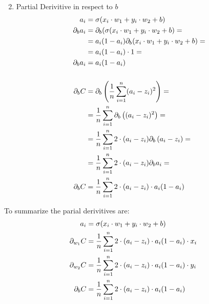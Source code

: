 \documentclass{article}
\begin{document}
\begin{enumerate}
{\begin{align}
        \end{align}
    }
    \item{
        Partial Derivitive in respect to $b$
        \begin{align}
            a_i  &= \sigma(x_i \cdot w_1 + y_i \cdot w_2 + b)  \\ 
            \pd[b]a_i &= \pd[b](\sigma(x_i \cdot w_1 + y_i \cdot w_2 + b) = \\ 
                      &= a_i(1 - a_i)\pd[b](x_i \cdot w_1 + y_i \cdot w_2 +b) = \\ 
                      &= a_i(1 - a_i) \cdot 1 = \\ 
            \pd[b]a_i &= a_i(1 - a_i) \\ 
            \\
            \pd[b]C &=\pd[b]\left(\avgsum[i, n](a_i - z_i)^2\right) =  \\ 
                    &=\avgsum[i, n]\pd[b]\left((a_i - z_i)^2\right) =  \\ 
                    &=\avgsum[i, n]2 \cdot (a_i - z_i)\pd[b]\left(a_i - z_i\right) = \\ 
                    &=\avgsum[i, n]2 \cdot (a_i - z_i)\pd[b]a_i = \\ 
            \pd[b]C &=\avgsum[i, n]2 \cdot (a_i - z_i) \cdot a_i(1 - a_i) \\ 
        \end{align}
    }
\end{enumerate}
To summarize the parial derivitives are:
\begin{align}
    a_i  &= \sigma(x_i \cdot w_1 + y_i \cdot w_2 + b) \\ 
\pd[w_1]C &=\avgsum[i, n]2 \cdot (a_i - z_i) \cdot a_i(1 - a_i) \cdot x_i \\ 
\pd[w_2]C &=\avgsum[i, n]2 \cdot (a_i - z_i) \cdot a_i(1 - a_i) \cdot y_i \\ 
\pd[b]C   &=\avgsum[i, n]2 \cdot (a_i - z_i) \cdot a_i(1 - a_i) \\ 
\end{align}
\end{document}
